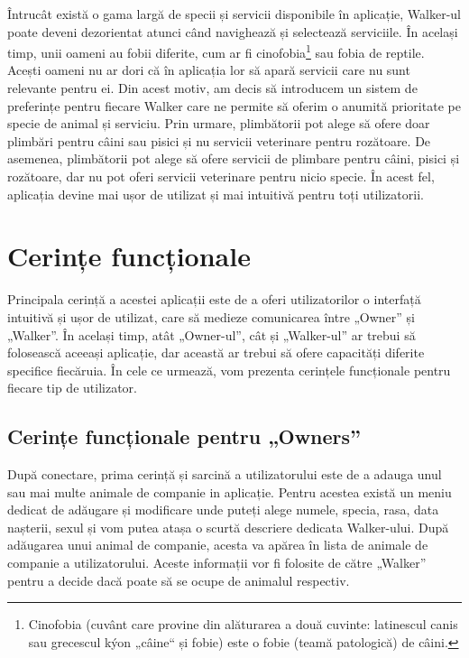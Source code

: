 Întrucât există o gama largă de specii și servicii disponibile în aplicație, Walker-ul poate deveni dezorientat atunci când navighează și selectează serviciile. În același timp, unii oameni au fobii diferite, cum ar fi cinofobia\footnote{Cinofobia (cuvânt care provine din alăturarea a două cuvinte: latinescul canis sau grecescul kýon „câine“ și fobie) este o fobie (teamă patologică) de câini. } sau fobia de reptile. Acești oameni nu ar dori că în aplicația lor să apară servicii care nu sunt relevante pentru ei. Din acest motiv, am decis să introducem un sistem de preferințe pentru fiecare Walker care ne permite să oferim o anumită prioritate pe specie de animal și serviciu. Prin urmare, plimbătorii pot alege să ofere doar plimbări pentru câini sau pisici și nu servicii veterinare pentru rozătoare. De asemenea, plimbătorii pot alege să ofere servicii de plimbare pentru câini, pisici și rozătoare, dar nu pot oferi servicii veterinare pentru nicio specie. În acest fel, aplicația devine mai ușor de utilizat și mai intuitivă pentru toți utilizatorii.


\section{Cerințe funcționale}

Principala cerință a acestei aplicații este de a oferi utilizatorilor o interfață intuitivă și ușor de utilizat, care să medieze comunicarea între „Owner” și „Walker”. În același timp, atât „Owner-ul”, cât și „Walker-ul” ar trebui să folosească aceeași aplicație, dar această ar trebui să ofere capacități diferite specifice fiecăruia. În cele ce urmează, vom prezenta cerințele funcționale pentru fiecare tip de utilizator.

\subsection{Cerințe funcționale pentru „Owners”}

După conectare, prima cerință și sarcină a utilizatorului este de a adauga unul sau mai multe animale de companie in aplicație. Pentru acestea există un meniu dedicat de adăugare și modificare unde puteți alege numele, specia, rasa, data nașterii, sexul și vom putea atașa o scurtă descriere dedicata Walker-ului. După adăugarea unui animal de companie, acesta va apărea în lista de animale de companie a utilizatorului. Aceste informații vor fi folosite de către „Walker” pentru a decide dacă poate să se ocupe de animalul respectiv. 

